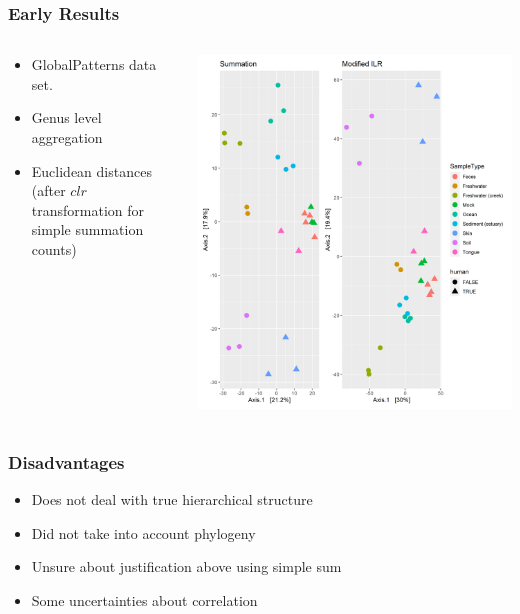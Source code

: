 \documentclass{beamer}
\begin{document}
\begin{frame}
    \frametitle{Early Results}
    \begin{columns}
        \begin{column}{0.5\textwidth}
            \begin{itemize}
                \item GlobalPatterns data set. 
                \item Genus level aggregation 
                \item Euclidean distances (after $clr$ transformation for simple summation counts)
            \end{itemize}
        \end{column}
        \begin{column}{0.5\textwidth}
            \begin{center}
                \includegraphics[scale=0.325]{figures/prelim_results.png}
            \end{center}
        \end{column}
    \end{columns}
\end{frame}

\begin{frame}
    \frametitle{Disadvantages}  
    \begin{itemize}
        \item Does not deal with true hierarchical structure
        \item Did not take into account phylogeny 
        \item Unsure about justification above using simple sum 
        \item Some uncertainties about correlation
    \end{itemize}
\end{frame}
\end{document}
